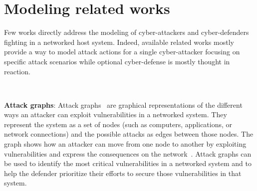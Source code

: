 \documentclass[conference]{IEEEtran}
\newcommand{\after}[1]{\textcolor{green}{#1}}
\newcommand{\rem}[1]{\textcolor{red}{#1}}
\begin{document}

\section{Modeling related works}

\noindent

Few works directly address the modeling of cyber-attackers and cyber-defenders fighting in a networked host system. Indeed, available related works mostly provide a way to model attack actions for a single cyber-attacker focusing on specific attack scenarios while optional cyber-defense is mostly thought in reaction.


\

\noindent
\textbf{Attack graphs}: \quad Attack graphs~\cite{CPhilips1998} are graphical representations of the different ways an attacker can exploit vulnerabilities in a networked system. They represent the system as a set of nodes (such as computers, applications, or network connections) and the possible attacks as edges between those nodes. The graph shows how an attacker can move from one node to another by exploiting vulnerabilities and express the consequences on the network~\cite{CPhilips1998}.
Attack graphs can be used to identify the most critical vulnerabilities in a networked system and to help the defender prioritize their efforts to secure those vulnerabilities in that system.
\end{document}
